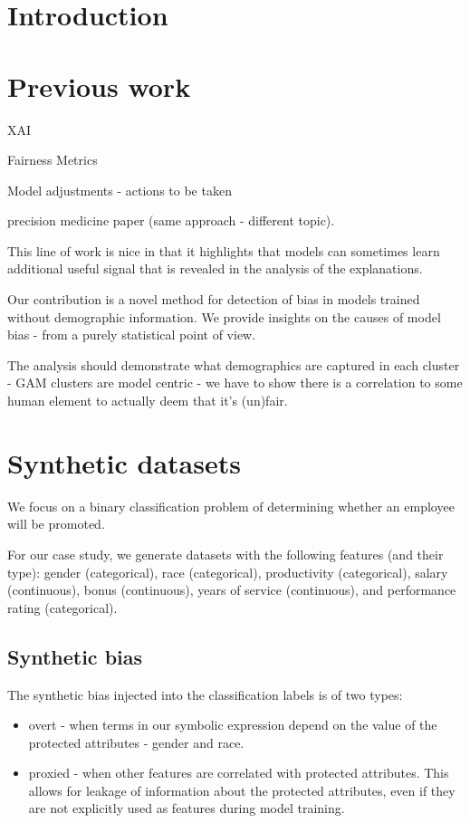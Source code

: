 \documentclass[manuscript,screen,review]{acmart}
\begin{document}
\maketitle

\section{Introduction}


\section{Previous work}

XAI

Fairness Metrics

Model adjustments - actions to be taken

precision medicine paper (same approach - different topic).  

This line of work is nice in that it highlights that models can sometimes learn additional useful signal that is revealed in the analysis of the explanations.

Our contribution is a novel method for detection of bias in models trained without demographic information.  We provide insights on the causes of model bias - from a purely statistical point of view.  

The analysis should demonstrate what demographics are captured in each cluster - GAM clusters are model centric - we have to show there is a correlation to some human element to actually deem that it's (un)fair.

\section{Synthetic datasets}
We focus on a binary classification problem of determining whether an employee will be promoted.

For our case study, we generate datasets with the following features (and their type): gender (categorical), race (categorical), productivity (categorical), salary (continuous), bonus (continuous), years of service (continuous),  and performance rating (categorical).

\subsection{Synthetic bias}
The synthetic bias injected into the classification labels is of two types:
\begin{itemize}
    \item overt - when terms in our symbolic expression depend on the value of the protected attributes - gender and race.
    \item proxied - when other features are correlated with protected attributes.  This allows for leakage of information about the protected attributes, even if they are not explicitly used as features during model training.
\end{itemize}
\end{document}
